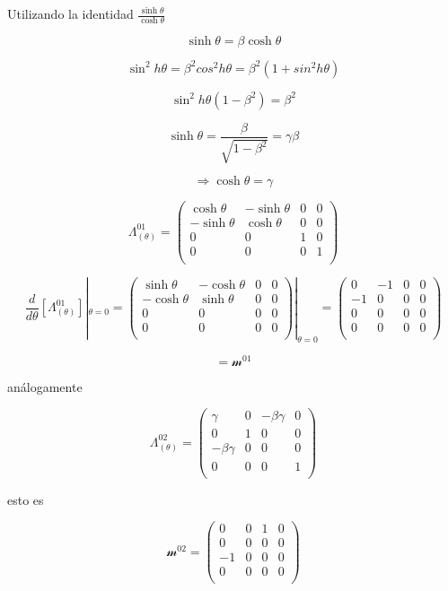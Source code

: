 \documentclass{report}
\begin{document}
Utilizando la identidad $\frac{\sinh \theta}{\cosh \theta}$

\[\sinh \theta = \beta \cosh \theta\]

\[\sin^2 h \theta = \beta^{2} cos^2 h \theta = \beta^2 (1+sin^2 h \theta)\]

\[\sin^2 h \theta (1- \beta^2) = \beta^2\]

\[\sinh \theta = \frac{\beta}{\sqrt{1-\beta^2}} = \gamma \beta\]

\[\Rightarrow \cosh \theta = \gamma\]

\[\Lambda_{(\theta)}^{01} = \left ( \begin{array}{cccc}
 \cosh \theta & -\sinh \theta & 0& 0 \\
 -\sinh \theta & \cosh \theta & 0 &0 \\
0 & 0 & 1 &0 \\
0 & 0 & 0 &1 \\ \end{array} \right) 
\]

\[\frac{d}{d \theta} [\Lambda_{(\theta)}^{01}]|_{\theta = 0} = \left ( \begin{array}{cccc}
 \sinh \theta & -\cosh \theta & 0& 0 \\
 -\cosh \theta & \sinh \theta  & 0 &0 \\
0 & 0 & 0 &0 \\
0 & 0 & 0 &0 \\ \end{array} \right) |_{\theta = 0} = \left ( \begin{array}{cccc}
 0 & -1 & 0& 0 \\
 -1 & 0  & 0 &0 \\
0 & 0 & 0 &0 \\
0 & 0 & 0 &0 \\ \end{array} \right)
\]

\[= \mathscr{m}^{01}\]

análogamente

\[\Lambda_{(\theta)}^{02} = \left ( \begin{array}{cccc}
 \gamma & 0 & -\beta \gamma & 0 \\
 0 & 1 & 0 &0 \\
-\beta \gamma & 0 & 0 &0 \\
0 & 0 & 0 &1 \\ \end{array} \right) 
\]

esto es

\[\mathscr{m}^{02} = \left ( \begin{array}{cccc}
 0 & 0 & 1 & 0 \\
 0 & 0 & 0 &0 \\
-1 & 0 & 0 &0 \\
0 & 0 & 0 &0 \\ \end{array} \right) 
\]
\end{document}
